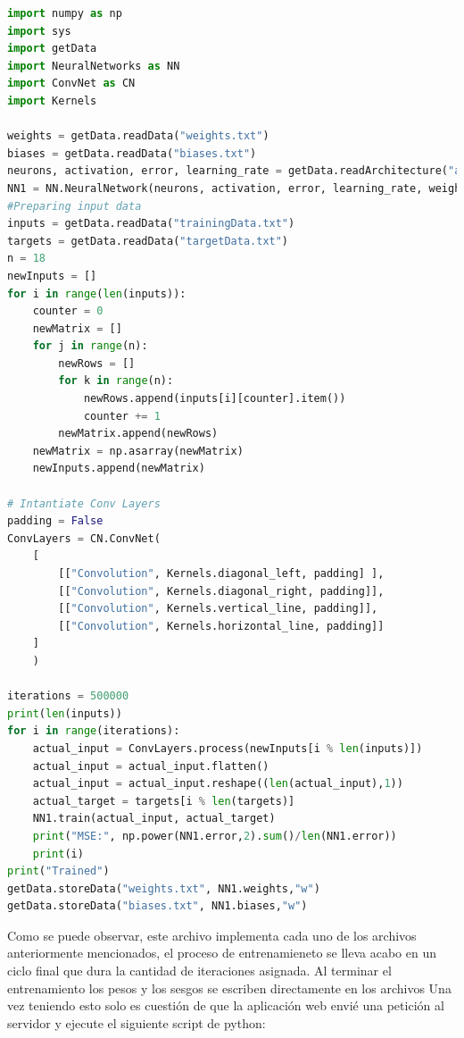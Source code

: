 \documentclass{article}
\begin{document}
\begin{lstlisting}[language=python]
import numpy as np 
import sys
import getData
import NeuralNetworks as NN
import ConvNet as CN
import Kernels

weights = getData.readData("weights.txt")
biases = getData.readData("biases.txt")
neurons, activation, error, learning_rate = getData.readArchitecture("architecture.txt")
NN1 = NN.NeuralNetwork(neurons, activation, error, learning_rate, weights=weights, biases=biases)
#Preparing input data
inputs = getData.readData("trainingData.txt")
targets = getData.readData("targetData.txt")
n = 18
newInputs = []
for i in range(len(inputs)):
    counter = 0
    newMatrix = []
    for j in range(n):
        newRows = []
        for k in range(n):
            newRows.append(inputs[i][counter].item())
            counter += 1
        newMatrix.append(newRows)
    newMatrix = np.asarray(newMatrix)
    newInputs.append(newMatrix)

# Intantiate Conv Layers
padding = False
ConvLayers = CN.ConvNet(
    [
        [["Convolution", Kernels.diagonal_left, padding] ],
        [["Convolution", Kernels.diagonal_right, padding]],
        [["Convolution", Kernels.vertical_line, padding]],
        [["Convolution", Kernels.horizontal_line, padding]]
    ]
    )     

iterations = 500000
print(len(inputs))
for i in range(iterations):
    actual_input = ConvLayers.process(newInputs[i % len(inputs)])
    actual_input = actual_input.flatten()
    actual_input = actual_input.reshape((len(actual_input),1))
    actual_target = targets[i % len(targets)]
    NN1.train(actual_input, actual_target)
    print("MSE:", np.power(NN1.error,2).sum()/len(NN1.error))
    print(i)
print("Trained")
getData.storeData("weights.txt", NN1.weights,"w")
getData.storeData("biases.txt", NN1.biases,"w")
\end{lstlisting}
Como se puede observar, este archivo implementa cada uno de los archivos anteriormente mencionados, el proceso de entrenamieneto se lleva acabo en un ciclo final 
que dura la cantidad de iteraciones asignada. Al terminar el entrenamiento los pesos y los sesgos se escriben directamente en los archivos
Una vez teniendo esto solo es cuestión de que la aplicación web envié una petición al servidor y ejecute el siguiente script de python:
\end{document}
